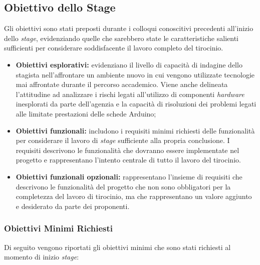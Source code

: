\subsection{Obiettivo dello Stage}

Gli obiettivi sono stati preposti durante i colloqui conoscitivi precedenti all'inizio dello \textit{stage}, evidenziando quelle che sarebbero state le caratteristiche salienti sufficienti per considerare soddisfacente il lavoro completo del tirocinio.

\begin{itemize}

	\item \textbf{Obiettivi esplorativi:} evidenziano il livello di capacità di indagine dello stagista nell'affrontare un ambiente nuovo in cui vengono utilizzate tecnologie mai affrontate durante il percorso accademico. Viene anche delineata l'attitudine ad analizzare i rischi legati all'utilizzo di componenti \textit{hardware} inesplorati da parte dell'agenzia e la capacità di risoluzioni dei problemi legati alle limitate prestazioni delle schede Arduino;
	
	\item \textbf{Obiettivi funzionali:} includono i requisiti minimi richiesti delle funzionalità per considerare il lavoro di \textit{stage} sufficiente alla propria conclusione. I requisiti descrivono le funzionalità che dovranno essere implementate nel progetto e rappresentano l'intento centrale di tutto il lavoro del tirocinio.
	
	\item \textbf{Obiettivi funzionali opzionali:} rappresentano l'insieme di requisiti che descrivono le funzionalità del progetto che non sono obbligatori per la completezza del lavoro di tirocinio, ma che rappresentano un valore aggiunto e desiderato da parte dei proponenti.
\end{itemize}

\subsubsection{Obiettivi Minimi Richiesti}
Di seguito vengono riportati gli obiettivi minimi che sono stati richiesti al momento di inizio \textit{stage}:

